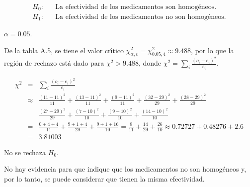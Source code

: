 \begin{solucion}
 \begin{hipotesis}
  \begin{eqnarray*}
   H_0: & & \text{La efectividad de los medicamentos son homog\'eneos.} \\
   H_1: & & \text{La efectividad de los medicamentos no son homog\'eneos.}
  \end{eqnarray*}
 \end{hipotesis}

 \begin{significancia}
  $\alpha = 0.05$.
 \end{significancia}

 \begin{region}
  De la tabla A.5, se tiene el valor cr\'{\i}tico
  $\chi^2_{\alpha,v} = \chi^2_{0.05,4} \approx 9.488$,
  por lo que la regi\'on de rechazo est\'a dado
  para $\chi^2 > 9.488$, donde
  $\chi^2 = \sum_{i} \frac{\left( o_i - e_i \right)^2}{e_i}$.
 \end{region}

 \begin{estadistico}
  \begin{eqnarray*}
   \chi^2 & = & \sum_{i} \frac{\left( o_i - e_i \right)^2}{e_i} \\
   & \approx & \frac{(11 - 11)^2}{11} + \frac{(13 - 11)^2}{11} +
   \frac{(9 - 11)^2}{11} + \frac{(32 - 29)^2}{29} + \frac{(28 - 29)^2}{29} \\
   & & \frac{(27 - 29)^2}{29} + \frac{(7 - 10)^2}{10} + 
   \frac{(9 - 10)^2}{10} + \frac{(14 - 10)^2}{10} \\
   & = & \frac{0 + 4 + 4}{11} + \frac{9 + 1 + 4}{29} + 
   \frac{9 + 1+ 16}{10} = \frac{8}{11} + \frac{14}{29} + \frac{26}{10}
   \approx 0.72727 + 0.48276 + 2.6 \\
   & = & 3.81003
  \end{eqnarray*}
 \end{estadistico}

 \begin{decision}
  No se rechaza $H_0$.
 \end{decision}

 \begin{conclusion}
  No hay evidencia para que indique que los medicamentos no son homog\'eneos
  y, por lo tanto, se puede considerar que tienen la misma efectividad.
 \end{conclusion}


\end{solucion}

